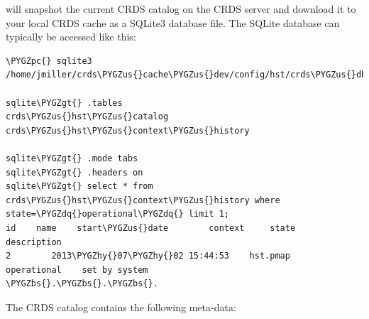 \documentclass[letterpaper,10pt,english]{sphinxmanual}
\def\PYGZbs{\char`\\}
\def\PYGZus{\char`\_}
\def\PYGZgt{\char`\>}
\def\PYGZpc{\char`\%}
\def\PYGZhy{\char`\-}
\def\PYGZdq{\char`\"}
\begin{document}
will snapshot the current CRDS catalog on the CRDS server and download it to your local CRDS cache as a
SQLite3 database file.  The SQLite database can typically be accessed like this:

\begin{Verbatim}[commandchars=\\\{\}]
\PYGZpc{} sqlite3 /home/jmiller/crds\PYGZus{}cache\PYGZus{}dev/config/hst/crds\PYGZus{}db.sqlite3

sqlite\PYGZgt{} .tables
crds\PYGZus{}hst\PYGZus{}catalog       crds\PYGZus{}hst\PYGZus{}context\PYGZus{}history

sqlite\PYGZgt{} .mode tabs
sqlite\PYGZgt{} .headers on
sqlite\PYGZgt{} select * from crds\PYGZus{}hst\PYGZus{}context\PYGZus{}history where state=\PYGZdq{}operational\PYGZdq{} limit 1;
id    name    start\PYGZus{}date        context     state          description
2        2013\PYGZhy{}07\PYGZhy{}02 15:44:53    hst.pmap    operational    set by system
\PYGZbs{}.\PYGZbs{}.\PYGZbs{}.
\end{Verbatim}

The CRDS catalog contains the following meta-data:
\end{document}
